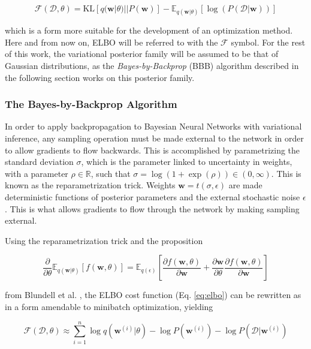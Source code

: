 	\begin{equation}
	\label{eq:elbo}
		\mathcal{F}(\mathcal{D}, \theta) = 
		\text{KL}[q(\pmb{w}|\theta) || P(\pmb{w})] - \mathbb{E}_{q(\pmb{w}|\theta)}[\log(P(\mathcal{D}|\pmb{w}))]
	\end{equation}
	
	which is a form more suitable for the development of an optimization method. Here and from now on, ELBO will be referred to with the $\mathcal{F}$ symbol. For the rest of this work, the variational posterior family will be assumed to be that of Gaussian distributions, as the \textit{Bayes-by-Backprop} (BBB) algorithm described in the following section works on this posterior family. 
	
	\subsubsection*{The Bayes-by-Backprop Algorithm}

	In order to apply backpropagation to Bayesian Neural Networks with variational inference, any sampling operation must be made external to the network in order to allow gradients to flow backwards. This is accomplished by parametrizing the standard deviation $\sigma$, which is the parameter linked to uncertainty in weights, with a parameter $\rho \in \mathbb{R}$, such that $\sigma = \log(1 + \exp(\rho)) \in (0,\infty)$. 
	This is known as the reparametrization trick. Weights $\pmb{w} = t(\sigma, \epsilon)$ are made deterministic functions of posterior parameters and the external stochastic noise $\epsilon$. This is what allows gradients to flow through the network by making sampling external. 
	
	Using the reparametrization trick and the proposition
	
	\begin{equation}
	\label{eq:prop}
	\frac{\partial}{\partial \theta} \mathbb{E}_{q(\pmb{w}|\theta)}[f(\pmb{w}, \theta)] =
	\mathbb{E}_{q(\epsilon)}[\frac{\partial f(\pmb{w}, \theta)}{\partial \pmb{w}} + \frac{\partial \pmb{w}}{\partial \theta}
	\frac{\partial f(\pmb{w}, \theta)}{\partial \pmb{w}}]
	\end{equation}
	
	from Blundell et al. \cite{blundell_weight_2015}, the ELBO cost function (Eq. \ref{eq:elbo}) can be rewritten as in a form amendable to minibatch optimization, yielding
	
	\begin{equation}
	\label{eq:mini_elbo}
	\mathcal{F}(\mathcal{D}, \theta) \approx \sum_{i=1}^{n}\log q(\pmb{w}^{(i)}|\theta) - \log P(\pmb{w}^{(i)}) - \log P(\mathcal{D}|\pmb{w}^{(i)})
	\end{equation}
	
